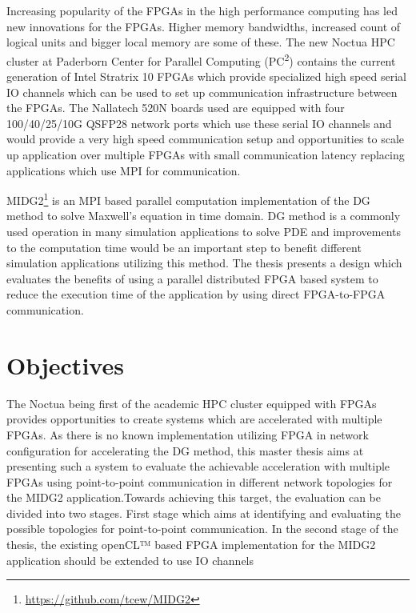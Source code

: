 Increasing popularity of the FPGAs in the high performance computing has led new innovations for
the FPGAs. Higher memory bandwidths, increased count of logical units and bigger local memory
are some of these. The new Noctua \ac{HPC} cluster at Paderborn Center for Parallel
Computing (PC\textsuperscript{2}) contains the current generation of Intel Stratrix 10 FPGAs which provide
specialized high speed serial IO channels which can be used to set up communication infrastructure
between the FPGAs. The Nallatech 520N boards used are equipped with four 100/40/25/10G
QSFP28 network ports which use these serial IO channels and would provide a very high speed
communication setup and opportunities to scale up application over multiple FPGAs with small
communication latency replacing applications which use MPI for communication.

MIDG2\footnote{\url{https://github.com/tcew/MIDG2}} is an MPI based parallel computation
implementation of the \ac{DG} \cite{hesthaven_nodal_2008} method to solve Maxwell’s equation
in time domain. \ac{DG} method is a commonly used operation in many simulation applications to
solve \ac{PDE} and improvements to the computation time would be an important step to
benefit different simulation applications utilizing this method. The thesis presents
a design which evaluates the benefits of using a parallel distributed FPGA based system
to reduce the execution time of the application by using direct FPGA-to-FPGA communication.

\section{Objectives}

The Noctua being first of the academic \ac{HPC} cluster equipped with FPGAs provides
opportunities to create systems which are accelerated with multiple FPGAs. As there is
no known implementation utilizing FPGA in network configuration for accelerating the
DG method, this master thesis aims at presenting such a system to evaluate
the achievable acceleration with multiple FPGAs using point-to-point communication in
different network topologies for the MIDG2 application.Towards achieving this target,
the evaluation can be divided into two stages. First stage which aims at identifying
and evaluating the possible topologies for point-to-point communication. In the second
stage of the thesis, the existing openCL™ based FPGA implementation for
the MIDG2 application should be extended to use IO channels

